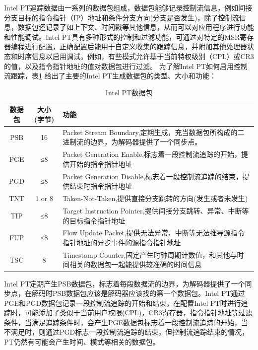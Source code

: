 Intel PT追踪数据由一系列的数据包组成，数据包能够记录控制流信息，例如间接分支目标的指令指针（IP）地址和条件分支方向(分支是否发生)，除了控制流信息，数据包还记录了如上下文、时间戳等其他信息，从而可以对应用程序进行功能和性能调试。Intel PT具有多种形式的控制和过滤功能，可通过对特定的MSR寄存器编程进行配置，正确配置后能用于自定义收集的跟踪信息，并附加其他处理器状态和时序信息以启用调试。例如，有些模式允许基于当前特权级别（CPL）或CR3的值，以及指令指针地址的值对数据包进行过滤。
为了解Intel PT如何启用控制流跟踪，表\ref{tab:1} 给出了主要的Intel PT生成数据包的类型、大小和功能：
\begin{table}[ht]
  \centering
  \caption{Intel PT数据包}
  \label{tab:1}
  \begin{tabular}{c|c|p{8cm}}
    \hline
    数据包& 大小(字节)& 功能\\
    \hline
    PSB& 16& Packet Stream Boundary,定期生成，充当数据包所构成的二进制流的边界，为解码器提供了一个同步点。\\
    \hline
    PGE& ≤8& Packet Generation Enable,标志着一段控制流追踪的开始，提供开始的指令指针地址\\
    \hline
    PGD& ≤8& Packet Generation Disable,标志着一段控制流追踪的结束，提供结束时指令指针地址\\
    \hline
    TNT& 1 or 8& Taken-Not-Taken,提供直接分支跳转的方向(发生或者未发生)\\
    \hline
    TIP& ≤8& Target Instruction Pointer,提供间接分支跳转、异常、中断等的目标指令指针地址\\
    \hline
    FUP& ≤8 &Flow Update Packet,提供无法异常、中断等无法推导源指令指针地址的异步事件的源指令指针地址\\
    \hline
    TSC& 8& Timestamp Counter,固定产生时钟周期计数值，和其他与时间相关的数据包一起能提供较准确的时间信息\\
    \hline
  \end{tabular}
\end{table}

Intel PT定期产生PSB数据包，标志着每段数据流的边界，为解码器提供了一个同步点，在解码时PSB数据包应该是解码器应该找的第一个数据包。Intel PT通过PGE和PGD数据包记录一段控制流追踪的开始和结束，在配置Intel PT时进行追踪时，可能添加了类似于当前用户权限(CPL)，CR3寄存器，指令指针地址等过滤条件，当满足追踪条件时，会产生PGE数据包标志着一段控制流追踪的开始，当不满足时，则通过PGD标志一段控制流追踪的结束，但控制流追踪结束的情况，PT仍然有可能会产生时间、模式等相关的数据包。

